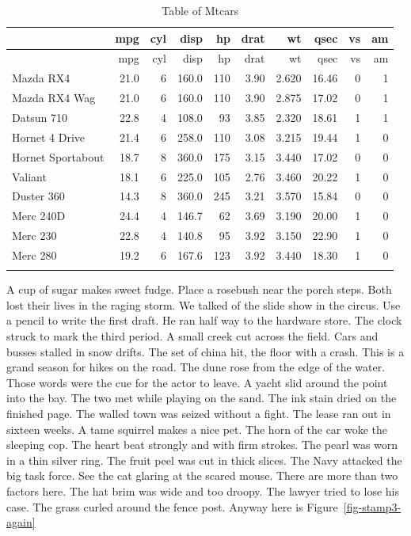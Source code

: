 \documentclass[
  letterpaper,
  DIV=11,
  numbers=noendperiod]{scrartcl}
\begin{document}
\hypertarget{tbl-mtcars}{}
\begin{longtable}[]{@{}lrrrrrrrrr@{}}
\toprule()
& mpg & cyl & disp & hp & drat & wt & qsec & vs & am \\
\midrule()
\endfirsthead
\toprule()
& mpg & cyl & disp & hp & drat & wt & qsec & vs & am \\
\midrule()
\endhead
Mazda RX4 & 21.0 & 6 & 160.0 & 110 & 3.90 & 2.620 & 16.46 & 0 & 1 \\
Mazda RX4 Wag & 21.0 & 6 & 160.0 & 110 & 3.90 & 2.875 & 17.02 & 0 & 1 \\
Datsun 710 & 22.8 & 4 & 108.0 & 93 & 3.85 & 2.320 & 18.61 & 1 & 1 \\
Hornet 4 Drive & 21.4 & 6 & 258.0 & 110 & 3.08 & 3.215 & 19.44 & 1 &
0 \\
Hornet Sportabout & 18.7 & 8 & 360.0 & 175 & 3.15 & 3.440 & 17.02 & 0 &
0 \\
Valiant & 18.1 & 6 & 225.0 & 105 & 2.76 & 3.460 & 20.22 & 1 & 0 \\
Duster 360 & 14.3 & 8 & 360.0 & 245 & 3.21 & 3.570 & 15.84 & 0 & 0 \\
Merc 240D & 24.4 & 4 & 146.7 & 62 & 3.69 & 3.190 & 20.00 & 1 & 0 \\
Merc 230 & 22.8 & 4 & 140.8 & 95 & 3.92 & 3.150 & 22.90 & 1 & 0 \\
Merc 280 & 19.2 & 6 & 167.6 & 123 & 3.92 & 3.440 & 18.30 & 1 & 0 \\
\bottomrule()
\caption{\label{tbl-mtcars}Table of Mtcars}\tabularnewline
\end{longtable}

A cup of sugar makes sweet fudge. Place a rosebush near the porch steps.
Both lost their lives in the raging storm. We talked of the slide show
in the circus. Use a pencil to write the first draft. He ran half way to
the hardware store. The clock struck to mark the third period. A small
creek cut across the field. Cars and busses stalled in snow drifts. The
set of china hit, the floor with a crash. This is a grand season for
hikes on the road. The dune rose from the edge of the water. Those words
were the cue for the actor to leave. A yacht slid around the point into
the bay. The two met while playing on the sand. The ink stain dried on
the finished page. The walled town was seized without a fight. The lease
ran out in sixteen weeks. A tame squirrel makes a nice pet. The horn of
the car woke the sleeping cop. The heart beat strongly and with firm
strokes. The pearl was worn in a thin silver ring. The fruit peel was
cut in thick slices. The Navy attacked the big task force. See the cat
glaring at the scared mouse. There are more than two factors here. The
hat brim was wide and too droopy. The lawyer tried to lose his case. The
grass curled around the fence post. Anyway here is
Figure~\ref{fig-stamp3-again}
\end{document}
